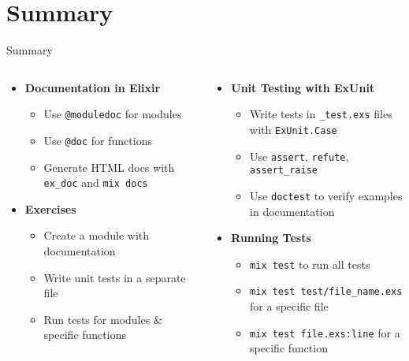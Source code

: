 \documentclass[aspectratio=169, table]{beamer}
\begin{document}
\section{Summary}
\begin{frame}{Summary}
\vspace{15pt}
\begin{columns}

\begin{column}[t]{0.5\textwidth}
\begin{itemize}
  \item \textbf{Documentation in Elixir}  
    \begin{itemize}
      \item Use \texttt{@moduledoc} for modules  
      \item Use \texttt{@doc} for functions  
      \item Generate HTML docs with \texttt{ex\_doc} and \texttt{mix docs}  
    \end{itemize}

  \item \textbf{Exercises}  
    \begin{itemize}
      \item Create a module with documentation  
      \item Write unit tests in a separate file  
      \item Run tests for modules \& specific functions  
    \end{itemize}
\end{itemize}
\end{column}

\begin{column}[t]{0.5\textwidth}
\begin{itemize}
  \item \textbf{Unit Testing with ExUnit}  
    \begin{itemize}
      \item Write tests in \texttt{\_test.exs} files with \texttt{ExUnit.Case}  
      \item Use \texttt{assert}, \texttt{refute}, \texttt{assert\_raise}  
      \item Use \texttt{doctest} to verify examples in documentation  
    \end{itemize}

  \item \textbf{Running Tests}  
    \begin{itemize}
      \item \texttt{mix test} to run all tests  
      \item \texttt{mix test test/file\_name.exs} for a specific file  
      \item \texttt{mix test file.exs:line} for a specific function  
    \end{itemize}
\end{itemize}
\end{column}

\end{columns}
\end{frame}
\end{document}

